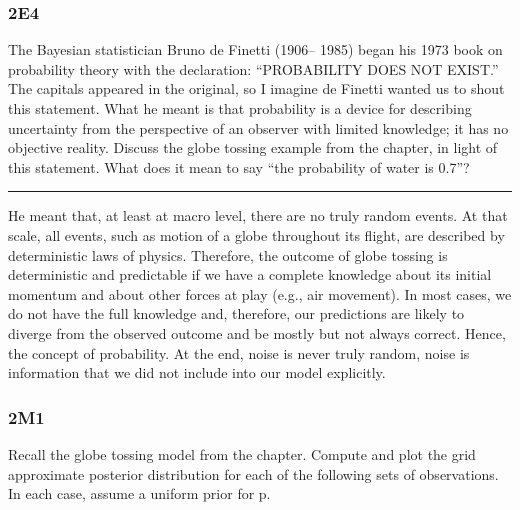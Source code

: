 \documentclass[
]{book}
\begin{document}
\hypertarget{e4}{%
\subsubsection*{2E4}\label{e4}}

The Bayesian statistician Bruno de Finetti (1906-- 1985) began his 1973 book on probability theory with the declaration: ``PROBABILITY DOES NOT EXIST.'' The capitals appeared in the original, so I imagine de Finetti wanted us to shout this statement. What he meant is that probability is a device for describing uncertainty from the perspective of an observer with limited knowledge; it has no objective reality. Discuss the globe tossing example from the chapter, in light of this statement. What does it mean to say ``the probability of water is 0.7''?

\begin{center}\rule{0.5\linewidth}{0.5pt}\end{center}

He meant that, at least at macro level, there are no truly random events. At that scale, all events, such as motion of a globe throughout its flight, are described by deterministic laws of physics. Therefore, the outcome of globe tossing is deterministic and predictable if we have a complete knowledge about its initial momentum and about other forces at play (e.g., air movement). In most cases, we do not have the full knowledge and, therefore, our predictions are likely to diverge from the observed outcome and be mostly but not always correct. Hence, the concept of probability. At the end, noise is never truly random, noise is information that we did not include into our model explicitly.

\hypertarget{m1}{%
\subsubsection*{2M1}\label{m1}}

Recall the globe tossing model from the chapter. Compute and plot the grid approximate posterior distribution for each of the following sets of observations. In each case, assume a uniform prior for p.
\end{document}
